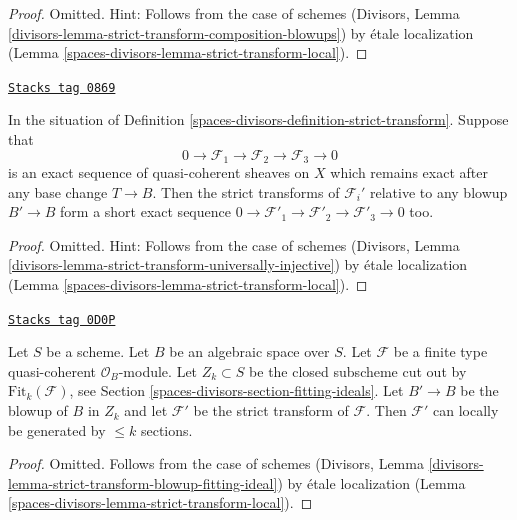 \begin{proof}
Omitted. Hint: Follows from the case of schemes
(Divisors, Lemma \ref{divisors-lemma-strict-transform-composition-blowups})
by \'etale localization (Lemma \ref{spaces-divisors-lemma-strict-transform-local}).
\end{proof}

\begin{lemma}
\label{spaces-divisors-lemma-strict-transform-universally-injective}
\href{https://stacks.math.columbia.edu/tag/0869}{\texttt{Stacks tag 0869}}

In the situation of Definition \ref{spaces-divisors-definition-strict-transform}.
Suppose that
$$
0 \to \mathcal{F}_1 \to \mathcal{F}_2 \to \mathcal{F}_3 \to 0
$$
is an exact sequence of quasi-coherent sheaves on $X$ which remains
exact after any base change $T \to B$. Then the strict transforms of
$\mathcal{F}_i'$ relative to any blowup $B' \to B$
form a short exact sequence
$0 \to \mathcal{F}'_1 \to \mathcal{F}'_2 \to \mathcal{F}'_3 \to 0$ too.
\end{lemma}

\begin{proof}
Omitted. Hint: Follows from the case of schemes
(Divisors, Lemma \ref{divisors-lemma-strict-transform-universally-injective})
by \'etale localization (Lemma \ref{spaces-divisors-lemma-strict-transform-local}).
\end{proof}

\begin{lemma}
\label{spaces-divisors-lemma-strict-transform-blowup-fitting-ideal}
\href{https://stacks.math.columbia.edu/tag/0D0P}{\texttt{Stacks tag 0D0P}}

Let $S$ be a scheme. Let $B$ be an algebraic space over $S$.
Let $\mathcal{F}$ be a finite type quasi-coherent $\mathcal{O}_B$-module.
Let $Z_k \subset S$ be the closed subscheme cut out by
$\text{Fit}_k(\mathcal{F})$, see Section \ref{spaces-divisors-section-fitting-ideals}.
Let $B' \to B$ be the blowup of $B$ in $Z_k$ and let
$\mathcal{F}'$ be the strict transform of $\mathcal{F}$.
Then $\mathcal{F}'$ can locally be generated by $\leq k$
sections.
\end{lemma}

\begin{proof}
Omitted. Follows from the case of schemes
(Divisors, Lemma \ref{divisors-lemma-strict-transform-blowup-fitting-ideal})
by \'etale localization (Lemma \ref{spaces-divisors-lemma-strict-transform-local}).
\end{proof}


